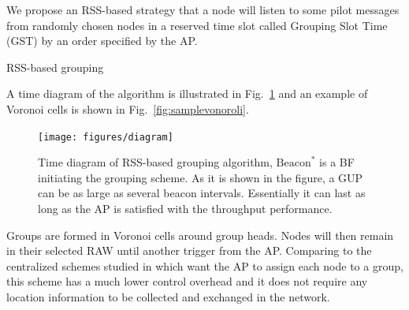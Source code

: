 We propose an RSS-based strategy that a node will listen to some pilot messages from randomly chosen nodes in a reserved time slot called Grouping Slot Time (GST) by an order specified by the AP.

\begin{algorithm} [H]
\caption{RSS-based grouping}
\end{algorithm}

A time diagram of the algorithm is illustrated in Fig.~\ref{fig:diagram} and an example of Voronoi cells is shown in Fig.~\ref{fig:samplevonoroli}.


\begin{figure} [th]
  \centering
  \texttt{[image: figures/diagram]}
  \caption{Time diagram of RSS-based grouping algorithm, $\text{Beacon}^{\ast}$ is a BF initiating the grouping scheme. As it is shown in the figure, a GUP can be as large as several beacon intervals. Essentially it can last as long as the AP is satisfied with the throughput performance.}
  \label{fig:diagram}
\end{figure}



Groups are formed in Voronoi cells around group heads. Nodes will then remain in their selected RAW until another trigger from the AP.
Comparing to the centralized schemes studied in \cite{zheng2014performance} which want the AP to assign each node to a group, this scheme has a much lower control overhead and it does not require any location information to be collected and exchanged in the network.%

